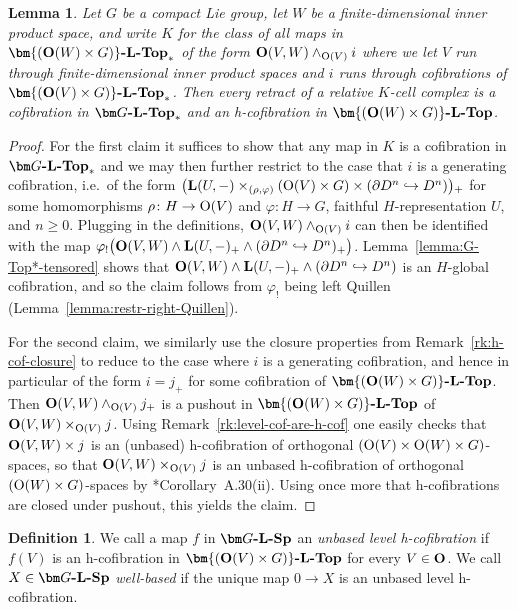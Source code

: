 \documentclass[reqno]{memo-l}
\theoremstyle{mythm}
\newtheorem{lemma}[thm]{Lemma}
\theoremstyle{definition}
\newtheorem{definition}[thm]{Definition}
\numberwithin{equation}{section}
\renewcommand{\phi}{\varphi}
\newcommand{\cat}[1]{\textbf{\textup{#1}}}
\renewcommand{\O}{{\textup{O}}}
\let\smashp=\wedge
\begin{document}
\begin{lemma}\label{lemma:fgt-unbased-h-cof}
    Let $G$ be a compact Lie group, let $W$ be a finite-dimensional inner product space, and write $K$ for the class of all maps in $\cat{$\bm{(\O(W)\times G)}$-$\cat{L}$-Top}_*$ of the form $\cat{O}(V,W)\smashp_{\O(V)} i$ where we let $V$ run through finite-dimensional inner product spaces and $i$ runs through cofibrations of $\cat{$\bm{(\O(V)\times G)}$-$\cat{L}$-Top}_*$. Then every retract of a relative $K$-cell complex is a cofibration in $\cat{$\bm G$-$\cat{L}$-Top}_*$ and an h-cofibration in $\cat{$\bm{(\O(W)\times G)}$-$\cat{L}$-Top}$.
\end{lemma}
\begin{proof}
    For the first claim it suffices to show that any map in $K$ is a cofibration in $\cat{$\bm G$-$\cat{L}$-Top}_*$ and we may then further restrict to the case that $i$ is a generating cofibration, i.e.~of the form $\big(\cat{L}(U,-)\times_{(\rho,\phi)}(\O(V)\times G)\times(\partial D^n\hookrightarrow D^n)\big){}_+$ for some homomorphisms $\rho\colon H\to\O(V)$ and $\phi\colon H\to G$, faithful $H$-representation $U$, and $n\ge0$. Plugging in the definitions, $\cat{O}(V,W)\smashp_{\O(V)} i$ can then be identified with the map $\phi_!\big(\cat{O}(V,W)\smashp\cat{L}(U,-)_+\smashp(\partial D^n\hookrightarrow D^n)_+\big)$. Lemma~\ref{lemma:G-Top*-tensored} shows that $\cat{O}(V,W)\smashp\cat{L}(U,-)_+\smashp(\partial D^n\hookrightarrow D^n)$ is an $H$-global cofibration, and so the claim follows from $\phi_!$ being left Quillen (Lemma~\ref{lemma:restr-right-Quillen}).
    
    For the second claim, we similarly use the closure properties from Remark~\ref{rk:h-cof-closure} to reduce to the case where $i$ is a generating cofibration, and hence in particular of the form $i=j_+$ for some cofibration of $\cat{$\bm{(\O(W)\times G)}$-$\cat{L}$-Top}$. Then $\cat{O}(V,W)\smashp_{\O(V)} j_+$ is a pushout in $\cat{$\bm{(\O(W)\times G)}$-$\cat{L}$-Top}$ of $\cat{O}(V,W)\times_{\O(V)} j$. Using Remark~\ref{rk:level-cof-are-h-cof} one easily checks that $\cat{O}(V,W)\times j$ is an (unbased) h-cofibration of orthogonal $(\O(V)\times\O(W)\times G)$-spaces, so that $\cat{O}(V,W)\times_{\O(V)} j$ is an unbased h-cofibration of orthogonal $(\O(W)\times G)$-spaces by \cite{schwede2018global}*{Corollary~A.30(ii)}. Using once more that h-cofibrations are closed under pushout, this yields the claim.
\end{proof}

\begin{definition}
    We call a map $f$ in $\cat{$\bm G$-$\cat{L}$-Sp}$ an \emph{unbased level h-cofibration} if $f(V)$ is an h-cofibration in $\cat{$\bm{(\O(V)\times G)}$-$\cat{L}$-Top}$ for every $V\in\cat{O}$. We call $X\in\cat{$\bm G$-$\cat{L}$-Sp}$ \emph{well-based} if the unique map $0\to X$ is an unbased level h-cofibration.
\end{definition}
\end{document}
